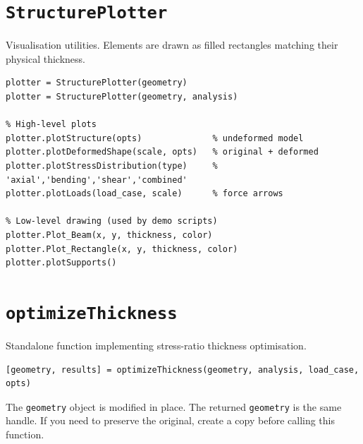 \section{\texttt{StructurePlotter}}
\label{sec:api:plotter}

Visualisation utilities.  Elements are drawn as filled rectangles matching
their physical thickness.

\begin{lstlisting}
plotter = StructurePlotter(geometry)
plotter = StructurePlotter(geometry, analysis)

% High-level plots
plotter.plotStructure(opts)              % undeformed model
plotter.plotDeformedShape(scale, opts)   % original + deformed
plotter.plotStressDistribution(type)     % 'axial','bending','shear','combined'
plotter.plotLoads(load_case, scale)      % force arrows

% Low-level drawing (used by demo scripts)
plotter.Plot_Beam(x, y, thickness, color)
plotter.Plot_Rectangle(x, y, thickness, color)
plotter.plotSupports()
\end{lstlisting}

\section{\texttt{optimizeThickness}}
\label{sec:api:optimize}

Standalone function implementing stress-ratio thickness optimisation.

\begin{lstlisting}
[geometry, results] = optimizeThickness(geometry, analysis, load_case, opts)
\end{lstlisting}

\begin{warnbox}
The \texttt{geometry} object is modified in place.  The returned
\texttt{geometry} is the same handle.  If you need to preserve the original,
create a copy before calling this function.
\end{warnbox}

